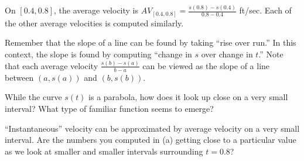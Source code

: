 \begin{bighint}
\ba
	\item On $[0.4,0.8]$, the average velocity is $AV_{[0.4,0.8]} = \frac{s(0.8)-s(0.4)}{0.8-0.4}$ ft/sec.  Each of the other average velocities is computed similarly.
	\item Remember that the slope of a line can be found by taking ``rise over run.''  In this context, the slope is found by computing ``change in $s$ over change in $t$.''  Note that each average velocity $\frac{s(b)-s(a)}{b-a}$ can be viewed as the slope of a line between $(a,s(a))$ and $(b,s(b))$.
	\item While the curve $s(t)$ is a parabola, how does it look up close on a very small interval?  What type of familiar function seems to emerge?
	\item ``Instantaneous'' velocity can be approximated by average velocity on a very small interval.  Are the numbers you computed in (a) getting close to a particular value as we look at smaller and smaller intervals surrounding $t = 0.8$?
\ea
\end{bighint}
